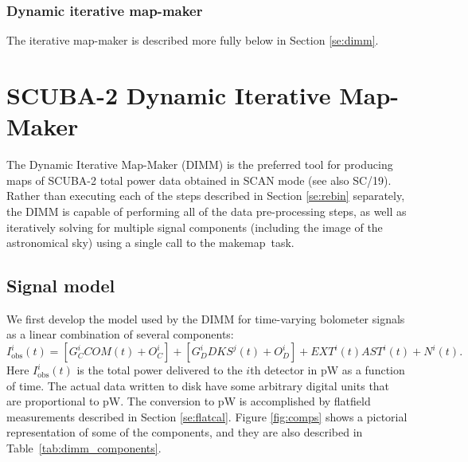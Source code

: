 \documentclass[twoside,11pt]{article}
\newcommand{\xref}[3]{#1}
\newcommand{\xlabel}[1]{}
\renewcommand{\_}{\texttt{\symbol{95}}}
\newcommand{\SMURFcook}{\xref{SC/19}{sc19}{}}
\newcommand{\task}[1]{\textsf{#1}}
\newcommand{\makemap}{\xref{\task{makemap}}{sun258}{MAKEMAP}}
\begin{document}
\subsubsection{\xlabel{iter}Dynamic iterative map-maker\label{se:iter}}

The iterative map-maker is described more fully below in Section
\ref{se:dimm}.


\section{\xlabel{dimm}SCUBA-2 Dynamic Iterative Map-Maker\label{se:dimm}}

The Dynamic Iterative Map-Maker (DIMM) is the preferred tool for
producing maps of SCUBA-2 total power data obtained in SCAN
mode\cite{sc2ana006} (see also \SMURFcook). Rather than executing each
of the steps described in Section \ref{se:rebin} separately, the DIMM
is capable of performing all of the data pre-processing steps, as well
as iteratively solving for multiple signal components (including the
image of the astronomical sky) using a single call to the \makemap\
task.

\subsection{Signal model}

We first develop the model used by the DIMM for time-varying bolometer
signals as a linear combination of several components:
%
\begin{equation}
I^i_{\mathrm{obs}}(t) = [G_C^i COM(t) + O_C^i] + [G_D^i DKS^j(t) + O_D^i] +
                      EXT^i(t) AST^i(t) + N^i(t).
\end{equation}
%
Here $I^i_{\mathrm{obs}}(t)$ is the total power delivered to the $i$th
detector in pW as a function of time. The actual data written to disk
have some arbitrary digital units that are proportional to pW. The
conversion to pW is accomplished by flatfield measurements described
in Section \ref{se:flatcal}. Figure \ref{fig:comps} shows a pictorial
representation of some of the components, and they are also described
in Table~\ref{tab:dimm_components}.
\end{document}
